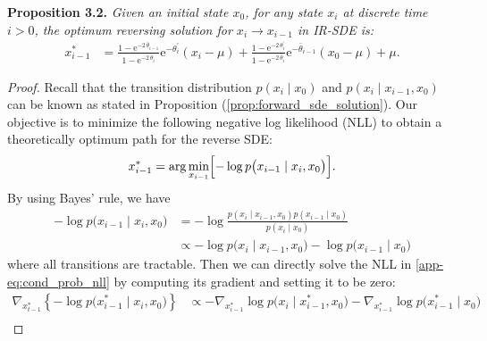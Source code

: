 \documentclass{article}
\newcommand{\expp}{\mathrm{e}}
\theoremstyle{plain}
\theoremstyle{definition}
\theoremstyle{remark}
\begin{document}
\textbf{Proposition 3.2.}
\label{prf:optimum_trajectory}
    \textit{Given an initial state ${x}_0$, for any state ${x}_i$ at discrete time $i > 0$, the optimum reversing solution for ${x}_i \rightarrow {x}_{i-1}$ in IR-SDE is:
\begin{equation}
    \begin{split}
        {x}_{i-1}^{*} &= \frac{1 - \expp^{-2 \, \bar{\theta}_{i-1}}}{1 - \expp^{-2 \, \bar{\theta}_i}} \expp^{-\theta_i^{'}} ({x}_i - \mu) + \frac{1 - \expp^{-2 \, \theta_i^{'}}}{1 - \expp^{-2 \, \bar{\theta}_i}} \expp^{-\bar{\theta}_{i-1}} ({x}_0 - \mu) + \mu.
    \end{split}
    \end{equation}
}

\begin{proof}

Recall that the transition distribution $p({x}_i \mid {x}_0)$ and $p({x}_i \mid {x}_{i-1}, {x}_0)$ can be known as stated in Proposition (\ref{prop:forward_sde_solution}). Our objective is to minimize the following negative log likelihood (NLL) to obtain a theoretically optimum path for the reverse SDE:
\begin{equation}
\begin{split}
    {x}_{i-1}^{*} = \arg\min_{{x}_{i-1}} \Bigl[ -\log p \bigl({x}_{i-1} \mid {x}_i, {x}_0 \bigr) \Bigr].
    \label{app-eq:cond_prob_nll}
\end{split}
\end{equation}
By using Bayes' rule, we have
\begin{equation}
\begin{split}
    -\log p \bigl({x}_{i-1} \mid {x}_i, {x}_0 \bigr) &= -\log \frac{p({x}_{i} \mid {x}_{i-1}, {x}_0) p({x}_{i-1} \mid {x}_0)}{p({x}_i \mid {x}_0)} \\[.6em]
    & \propto -\log p\bigl({x}_{i} \mid {x}_{i-1}, {x}_0\bigr) - \log p\bigl({x}_{i-1} \mid {x}_0\bigr)
\end{split}
\label{app-eq:cond_prob_bayes}
\end{equation}
where all transitions are tractable. Then we can directly solve the NLL in \eqref{app-eq:cond_prob_nll} by computing its gradient and setting it to be zero:
\begin{equation}
\begin{split}
     \nabla_{{x}_{t-1}^{*}} \left\{-\log p \bigl({x}_{i-1}^{*} \mid {x}_i, {x}_0 \bigr)\right\} 
     & \propto - \nabla_{{x}_{i-1}^{*}}\log p\bigl({x}_{i} \mid {x}_{i-1}^{*}, {x}_0\bigr) - \nabla_{{x}_{i-1}^{*}} \log p\bigl({x}_{i-1}^{*} \mid {x}_0\bigr) \\[.6em]

\end{split}
\end{equation}
\end{proof}
\end{document}
